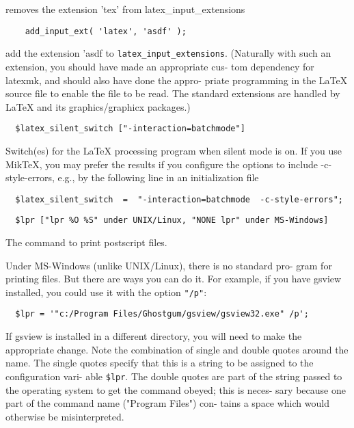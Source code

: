 removes the extension 'tex' from latex_input_extensions

\begin{verbatim}
	add_input_ext( 'latex', 'asdf' );
\end{verbatim}

add the extension 'asdf to  \verb|latex_input_extensions|.   (Naturally
with such an extension, you should have made an appropriate cus-
tom dependency for latexmk, and should also have done the appro-
priate  programming  in the LaTeX source file to enable the file
to be read.  The standard extensions are handled  by  LaTeX  and
its graphics/graphicx packages.)

\begin{verbatim}
  $latex_silent_switch ["-interaction=batchmode"]
\end{verbatim}

Switch(es)  for the LaTeX processing program when silent mode is
on.
If you use MikTeX, you may prefer the results if  you  configure
the  options  to include -c-style-errors, e.g., by the following
line in an initialization file

\begin{verbatim}
  $latex_silent_switch  =  "-interaction=batchmode  -c-style-errors";
\end{verbatim}

\begin{verbatim}
  $lpr ["lpr %O %S" under UNIX/Linux, "NONE lpr" under MS-Windows]
\end{verbatim}

The command to print postscript files.

Under  MS-Windows (unlike UNIX/Linux), there is no standard pro-
gram for printing files.  But there are ways you can do it.  For
example, if you have gsview installed, you could use it with the
option \verb|"/p"|:

\begin{verbatim}
  $lpr = '"c:/Program Files/Ghostgum/gsview/gsview32.exe" /p';
\end{verbatim}

If gsview is installed in a different directory, you  will  need
to  make the appropriate change.  Note the combination of single
and double quotes around the name.  The  single  quotes  specify
that  this is a string to be assigned to the configuration vari-
able \verb|$lpr|.  The double quotes are part of the string  passed  to
the  operating  system to get the command obeyed; this is neces-
sary because one part of the command name ("Program Files") con-
tains a space which would otherwise be misinterpreted.

